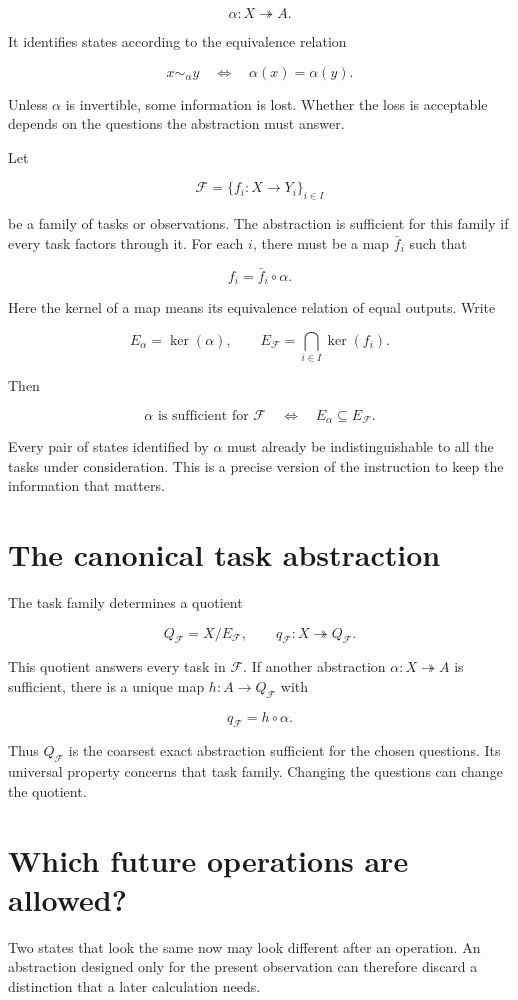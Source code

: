 \documentclass[11pt,oneside,openany]{book}
\begin{document}
\[
\alpha:X\twoheadrightarrow A.
\]

It identifies states according to the equivalence relation

\[
x\sim_\alpha y\quad\Longleftrightarrow\quad\alpha(x)=\alpha(y).
\]

Unless \(\alpha\) is invertible, some information is lost. Whether the loss is acceptable depends on the questions the abstraction must answer.

Let

\[
\mathcal F=\{f_i:X\longrightarrow Y_i\}_{i\in I}
\]

be a family of tasks or observations. The abstraction is sufficient for this family if every task factors through it. For each \(i\), there must be a map \(\bar f_i\) such that

\[
f_i=\bar f_i\circ\alpha.
\]

Here the kernel of a map means its equivalence relation of equal outputs. Write

\[
E_\alpha=\ker(\alpha),\qquad
E_{\mathcal F}=\bigcap_{i\in I}\ker(f_i).
\]

Then

\[
\alpha\text{ is sufficient for }\mathcal F
\quad\Longleftrightarrow\quad
E_\alpha\subseteq E_{\mathcal F}.
\]

Every pair of states identified by \(\alpha\) must already be indistinguishable to all the tasks under consideration. This is a precise version of the instruction to keep the information that matters.

\section{The canonical task abstraction}
The task family determines a quotient

\[
Q_{\mathcal F}=X/E_{\mathcal F},\qquad
q_{\mathcal F}:X\twoheadrightarrow Q_{\mathcal F}.
\]

This quotient answers every task in \(\mathcal F\). If another abstraction \(\alpha:X\twoheadrightarrow A\) is sufficient, there is a unique map \(h:A\longrightarrow Q_{\mathcal F}\) with

\[
q_{\mathcal F}=h\circ\alpha.
\]

Thus \(Q_{\mathcal F}\) is the coarsest exact abstraction sufficient for the chosen questions. Its universal property concerns that task family. Changing the questions can change the quotient.

\section{Which future operations are allowed?}
Two states that look the same now may look different after an operation. An abstraction designed only for the present observation can therefore discard a distinction that a later calculation needs.
\end{document}
